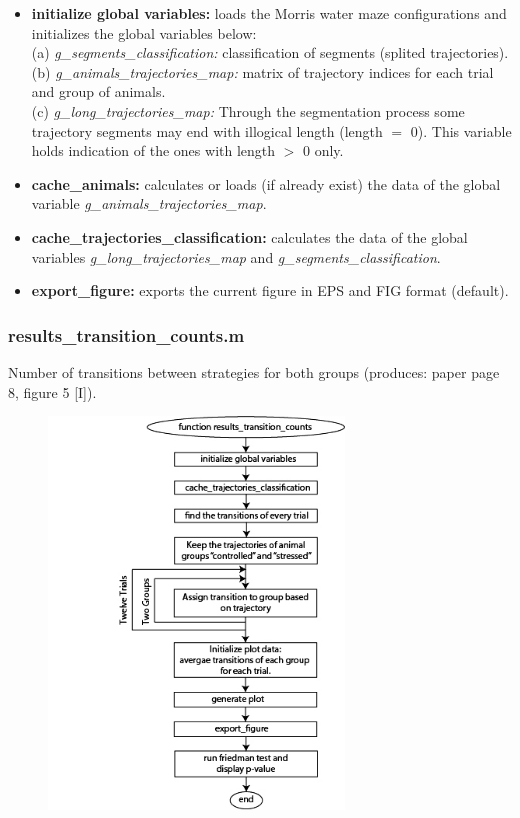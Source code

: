 \documentclass[12pt,titlepage]{article}
\begin{document}
\begin{doublespace}
\begin{itemize}
	\item\textbf{initialize global variables:} loads the Morris water maze configurations and initializes the global variables below:\\
	(a) \textit{g\_segments\_classification:} classification of segments (splited trajectories).\\
	(b) \textit{g\_animals\_trajectories\_map:} matrix of trajectory indices for each trial and group of animals.\\
	(c) \textit{g\_long\_trajectories\_map:} Through the segmentation process some trajectory segments may end with illogical length (length $=$ 0). This variable holds  indication of the ones with length $>$ 0 only.
	\item\textbf{cache\_animals:} calculates or loads (if already exist) the data of the global variable \textit{g\_animals\_trajectories\_map}.
	\item\textbf{cache\_trajectories\_classification:}  calculates the data of the global variables \textit{g\_long\_trajectories\_map} and \textit{g\_segments\_classification}.
	\item\textbf{export\_figure:} exports the current figure in EPS and FIG format (default).
\end{itemize}


\subsubsection{results\_transition\_counts.m}
Number of transitions between
strategies for both groups (produces: paper page 8, figure 5 [I]).

\begin{figure}[H]
	\begin{center}
		\includegraphics[width=0.7\textwidth]{results_transition_counts.jpg}
		\label{fig5i}
	\end{center}
\end{figure}


\end{doublespace}
\end{document}
